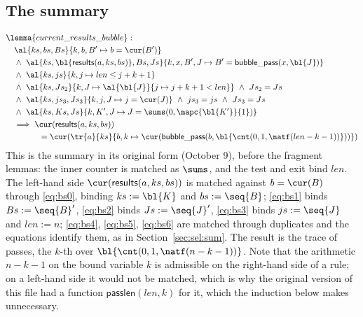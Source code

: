 \subsection{The summary}
\begin{align*}
  &\lemma{current\_results\_bubble}:\\
  &\quad \al{ks, bs, Bs}{k, b, B' \mapsto b = \cur(B')}\\
  &\quad\wedge\ \al{ks, \bl{\mathsf{results}(a, ks, bs)}, Bs, Js}{k, x, B', J \mapsto B' = \mathsf{bubble\_pass}(x, \bl{J})}\\
  &\quad\wedge\ \al{ks, js}{k, j \mapsto len \le j + k + 1}\\
  &\quad\wedge\ \al{ks, Js_2}{k, J \mapsto \al{\bl{J}}{j \mapsto j + k + 1 < len}}\ \wedge\ Js_2 = Js\\
  &\quad\wedge\ \al{ks, js_3, Js_3}{k, j, J \mapsto j = \cur(J)}\ \wedge\ js_3 = js\ \wedge\ Js_3 = Js\\
  &\quad\wedge\ \al{ks, Ks, Js}{k, K', J \mapsto J = \sums(0, \mapc{\bl{K'}}{1})}\\
  &\quad\Longrightarrow\ \cur(\mathsf{results}(a, ks, bs))\\
  &\qquad\qquad = \cur(\tr{a}{ks}{b, k \mapsto \cur(\mathsf{bubble\_pass}(b, \bl{\cnt(0, 1, \natf(len - k - 1))}))})
\end{align*}
This is the summary in its original form (October 9), before the fragment lemmas: the inner counter is
matched as $\sums$, and the test and exit bind $len$. The left-hand side $\cur(\mathsf{results}(a, ks, bs))$
is matched against $b = \cur(B)$ through \eqref{eq:bs0}, binding $ks := \bl{K}$ and $bs := \seq{B}$;
\eqref{eq:bs1} binds $Bs := \seq{B}'$, \eqref{eq:bs2} binds $Js := \seq{J}'$, \eqref{eq:bs3} binds
$js := \seq{J}$ and $len := n$; \eqref{eq:bs4}, \eqref{eq:bs5}, \eqref{eq:bs6} are matched through
duplicates and the equations identify them, as in Section~\ref{sec:sel:sum}. The result is the trace of passes, the
$k$-th over $\bl{\cnt(0, 1, \natf(n - k - 1))}$. Note that the arithmetic $n - k - 1$ on the bound
variable $k$ is admissible on the right-hand side of a rule; on a left-hand side it would not be matched,
which is why the original version of this file had a function $\mathsf{passlen}(len, k)$ for it, which
the induction below makes unnecessary.

